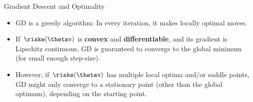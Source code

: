 
\begin{vbframe}{Gradient Descent and Optimality}

\begin{minipage}{0.45\textwidth}
    \begin{small}
    \begin{itemize}
      \item GD is a greedy algorithm: In every iteration, it makes locally optimal moves.
      \vspace*{2mm}
      \item If $\riske(\thetav)$ is \textbf{convex} and \textbf{differentiable}, and its gradient is Lipschitz continuous, GD is guaranteed to converge to the global minimum (for small enough step-size).  
      \vspace*{2mm}
    \item However, if $\riske(\thetav)$ has multiple local optima and/or saddle points, GD might only converge to a stationary point (other than the global optimum), depending on the starting point. 
    \end{itemize}
    \end{small}
  \end{minipage}\hfill
  \begin{minipage}{0.5\textwidth}
    \begin{figure}
      \centering

\end{figure}
\end{minipage}
\end{vbframe}
